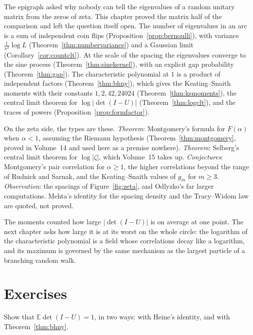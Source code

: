 The epigraph asked why nobody can tell the eigenvalues of a random unitary matrix from the zeros of zeta. This chapter proved the matrix half of the comparison and left the question itself open. The number of eigenvalues in an arc is a sum of independent coin flips (Proposition~\ref{prop:bernoulli}), with variance $\frac1{\pi^2}\log L$ (Theorem~\ref{thm:numbervariance}) and a Gaussian limit (Corollary~\ref{cor:countclt}). At the scale of the spacing the eigenvalues converge to the sine process (Theorem~\ref{thm:sinekernel}), with an explicit gap probability (Theorem~\ref{thm:gap}). The characteristic polynomial at $1$ is a product of independent factors (Theorem~\ref{thm:bhny}), which gives the Keating--Snaith moments with their constants $1,2,42,24024$ (Theorem~\ref{thm:ksmoments}), the central limit theorem for $\log|\det(I-U)|$ (Theorem~\ref{thm:logclt}), and the traces of powers (Proposition~\ref{prop:formfactor}).

On the zeta side, the types are these. \emph{Theorem}: Montgomery's formula for $F(\alpha)$ when $\alpha<1$, assuming the Riemann hypothesis (Theorem~\ref{thm:montgomery}, proved in Volume~14 and used here as a premise nowhere). \emph{Theorem}: Selberg's central limit theorem for $\log|\zeta|$, which Volume~15 takes up. \emph{Conjectures}: Montgomery's pair correlation for $\alpha\ge1$, the higher correlations beyond the range of Rudnick and Sarnak, and the Keating--Snaith values of $g_m$ for $m\ge3$. \emph{Observation}: the spacings of Figure~\ref{fig:zeta}, and Odlyzko's far larger computations. Mehta's identity for the spacing density and the Tracy--Widom law are quoted, not proved.

The moments counted how large $|\det(I-U)|$ is on average at one point. The next chapter asks how large it is at its worst on the whole circle: the logarithm of the characteristic polynomial is a field whose correlations decay like a logarithm, and its maximum is governed by the same mechanism as the largest particle of a branching random walk.

\section{Exercises}

\begin{exercise}[$\star$]\label{ex:meandet}
Show that $\mathbb E\det(I-U)=1$, in two ways: with Heine's identity, and with Theorem~\ref{thm:bhny}.
\end{exercise}

